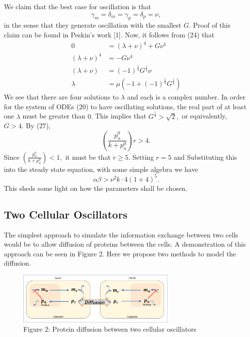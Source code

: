 \documentclass[12pt]{article}
\renewcommand{\(}{\left (}
\renewcommand{\)}{\right )}
\begin{document}
We claim that the best case for oscillation is that
\begin{equation}
    \gamma_m = \delta_m = \gamma_p = \delta_p = \nu,
\end{equation}
in the sense that they generate oscillation with the smallest $G.$ Proof of this claim can be found in Peskin's work [1]. Now, it follows from (24) that
\begin{align}
    0 &= (\lambda + \nu)^4 + G \nu ^4 \\
    (\lambda + \nu)^4 &= -G \nu ^4 \\
    (\lambda + \nu) &= (-1)^\frac{1}{4} G ^\frac{1}{4}\nu\\
    \lambda &= \mu (-1 + (-1)^\frac{1}{4} G ^\frac{1}{4})
\end{align}
We see that there are four solutions to $\lambda$ and each is a complex number. In order for the system of ODEs (20) to have oscillating solutions, the real part of at least one $\lambda$ must be greater than $0.$ This implies that $G^\frac{1}{4} > \sqrt{2},$ or equivalently, $G>4.$ By (27), \begin{equation}
    \left(\frac{p_n^0}{k+p_n^0}\right) r > 4.
\end{equation}
Since $ \left(\frac{p_n^0}{k+p_n^0}\right) < 1,$ it must be that $r\geq 5.$ Setting $r=5$ and Substituting this into the steady state equation, with some simple algebra we have
\begin{equation}
    \alpha \beta > \nu^2 k \cdot 4(1+4)^5.
\end{equation}
This sheds some light on how the parameters shall be chosen.

\subsection{Two Cellular Oscillators}
\hspace{5mm} The simplest approach to simulate the information exchange between two cells would be to allow diffusion of proteins between the cells. A demonstration of this approach can be seen in Figure 2. Here we propose two methods to model the diffusion.
\begin {figure}[h]
	\centering
	\includegraphics[width=0.7\textwidth]{two_cells.png}
	\caption*{\small Figure 2: Protein diffusion between two cellular oscillators}
\end {figure}
\end{document}
